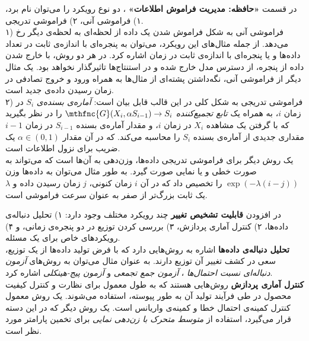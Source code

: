 در قسمت 
\textbf{
«حافظه: مدیریت فراموش اطلاعات»
}، 
دو نوع رویکرد را می‌توان نام برد، ۱) فراموشی آنی، ۲) فراموشی تدریجی.\\
۱) فراموشی آنی به شکل فراموش شدن یک داده از لحظه‌ای به لحظه‌ی دیگر رخ می‌دهد. از جمله مثال‌های این رویکرد، می‌توان به پنجره‌ای با اندازه‌ی ثابت در تعداد داده‌ها و یا پنجره‌ای با اندازه‌ی ثابت در زمان اشاره کرد. در هر دو روش، با خارج شدن داده از پنجره، از دسترس مدل خارج شده و در استنتاج‌ها تاثیرگذار نخواهد بود. یک مثال دیگر از فراموشی آنی، نگه‌داشتن پشته‌ای از مثال‌ها به همراه ورود و خروج تصادفی در زمان رسیدن داده‌ی جدید است.\\
۲) فراموشی تدریجی به شکل کلی در این قالب قابل بیان است: 
\textit{
آماره‌ی بسنده‌ی
} 
$S_{i}$ 
در زمان 
$i$، 
به همراه یک 
\textit{
تابع تجمیع‌کننده
} 
$\mthfnc{G}(X_{i},\alpha S_{i-1}) \rightarrow S_{i}$ 
را در نظر بگیرید که با گرفتن یک مشاهده 
$X_{i}$ 
در زمان 
$i$،
و مقدار آماره‌ی بسنده 
$S_{i-1}$ 
در زمان 
$i-1$
مقداری جدیدی از آماره‌ی بسنده 
$S_{i}$ 
را محاسبه می‌کند. که در آن مقدار 
$\alpha \in (0,1)$ 
یک ضریب برای نزول اطلاعات است.\\
یک روش دیگر برای فراموشی تدریجی داده‌ها، وزن‌دهی به آن‌ها است که می‌تواند به صورت خطی و یا نمایی صورت گیرد. به طور مثال می‌توان به داده‌ها وزن 
$\exp ( -\lambda (i - j) )$ 
را تخصیص داد که در آن 
$i$ 
زمان کنونی، 
$j$ 
زمان رسیدن داده و 
$\lambda$ 
یک ثابت بزرگ‌تر از صفر به عنوان سرعت فراموشی است.

\vspace{5mm}
در افزودن 
\textbf{
قابلیت تشخیص تغییر
} 
چند رویکرد مختلف وجود دارد: ۱) تحلیل دنباله‌ی داده‌ها، ۲) کنترل آماری پردازش، ۳) بررسی کردن توزیع در دو پنجره‌ی زمانی، و ۴) رویکردهای خاص برای یک مسئله.\\
\textbf{
تحلیل دنباله‌ی داده‌ها
} 
اشاره به روش‌هایی دارد که با فرض تولید داده‌ها از یک توزیع، سعی در کشف تغییر آن توزیع دارند. به عنوان مثال می‌توان به روش‌های 
\textit{
آزمون دنباله‌ای نسبت احتمال‌ها
}، 
\textit{
آزمون جمع تجمعی
} 
و 
\textit{
آزمون پیج-هینکلی
} 
اشاره کرد.\\
\textbf{
کنترل آماری پردازش
} 
روش‌هایی هستند که به طول معمول برای نظارت و کنترل کیفیت محصول در طی فرآیند تولید آن به طور پیوسته‌، استفاده می‌شوند. یک روش معمول کنترل کمینه‌ی احتمال خطا و کمینه‌ی واریانس است. یک روش دیگر که در این دسته قرار می‌گیرد، استفاده از 
\textit{
متوسط متحرک با زن‌دهی نمایی
} 
برای تخمین پارامتر مورد نظر است.


